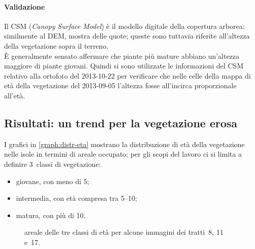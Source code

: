 \paragraph{Validazione}
Il CSM (\emph{Canopy Surface Model}) è il modello digitale della copertura arborea; similmente al DEM, mostra delle quote; queste sono tuttavia riferite all'altezza della vegetazione sopra il terreno.
\\
È generalmente sensato affermare che piante più mature abbiano un'altezza maggiore di piante giovani.
Quindi si sono utilizzate le informazioni del CSM relativo alla ortofoto del 2013-10-22 per verificare che nelle celle della mappa di età della vegetazione del 2013-09-05 l'altezza fosse all'incirca proporzionale all'età.

\subsection{Risultati: un trend per la vegetazione erosa}
I grafici in \vref{graph:distr-eta} mostrano la distribuzione di età della vegetazione nelle isole in termini di areale occupato; per gli scopi del lavoro ci si limita a definire 3~classi di vegetazione:
%
\begin{itemize}
	\item giovane, con meno di \SI{5}{\anni};
	\item intermedia, con età compresa tra \SIrange[range-phrase={ e }]{5}{10}{\anni};
	\item matura, con più di \SI{10}{\anni}.
\end{itemize}

\begin{figure}
	\centering
	
	\caption[areale delle classi d'età per i tratti~8, 11 e~17]{areale delle tre classi di età per alcune immagini dei tratti~8, 11 e~17.}%
	\label{graph:distr-eta}
\end{figure}
%

